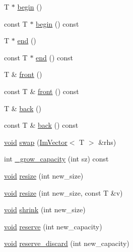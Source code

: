 \begin{DoxyCompactItemize}
\item 
T $\ast$ \hyperlink{structImVector_a470909b2720bc5cb71ec023439e9c814}{begin} ()
\item 
const T $\ast$ \hyperlink{structImVector_a05442a30c96197c24d17e736cd2a68b2}{begin} () const
\item 
T $\ast$ \hyperlink{structImVector_aeb429e7d05b6651dfc716ecdb198dde4}{end} ()
\item 
const T $\ast$ \hyperlink{structImVector_a541696299caf4b0477e57b27db70d32c}{end} () const
\item 
T \& \hyperlink{structImVector_a34ba855bd3a1ee3e2af215c5ce7d6ddc}{front} ()
\item 
const T \& \hyperlink{structImVector_a67e0e856307bbd927e4253461d3772c7}{front} () const
\item 
T \& \hyperlink{structImVector_a6da15f3c402099ed57078835ab942f8e}{back} ()
\item 
const T \& \hyperlink{structImVector_a480aba1c78064ca5370249b38a5ae207}{back} () const
\item 
\hyperlink{imgui__impl__opengl3__loader_8h_ac668e7cffd9e2e9cfee428b9b2f34fa7}{void} \hyperlink{structImVector_afcec0d2a1e28aebe412b6efd06f0a77a}{swap} (\hyperlink{structImVector}{Im\+Vector}$<$ T $>$ \&rhs)
\item 
int \hyperlink{structImVector_a3a097635d464b1b70dc7d59996a88b28}{\+\_\+grow\+\_\+capacity} (int sz) const
\item 
\hyperlink{imgui__impl__opengl3__loader_8h_ac668e7cffd9e2e9cfee428b9b2f34fa7}{void} \hyperlink{structImVector_ac371dd62e56ae486b1a5038cf07eee56}{resize} (int new\+\_\+size)
\item 
\hyperlink{imgui__impl__opengl3__loader_8h_ac668e7cffd9e2e9cfee428b9b2f34fa7}{void} \hyperlink{structImVector_abe7f21776ecfb7d0214963fd8c0689f0}{resize} (int new\+\_\+size, const T \&v)
\item 
\hyperlink{imgui__impl__opengl3__loader_8h_ac668e7cffd9e2e9cfee428b9b2f34fa7}{void} \hyperlink{structImVector_a8dafcce1e393244890f52ef1aa490876}{shrink} (int new\+\_\+size)
\item 
\hyperlink{imgui__impl__opengl3__loader_8h_ac668e7cffd9e2e9cfee428b9b2f34fa7}{void} \hyperlink{structImVector_a0f14f5736c3372157856eebb67123b75}{reserve} (int new\+\_\+capacity)
\item 
\hyperlink{imgui__impl__opengl3__loader_8h_ac668e7cffd9e2e9cfee428b9b2f34fa7}{void} \hyperlink{structImVector_a4120d4da7804ae0a34aa521dbb8e1994}{reserve\+\_\+discard} (int new\+\_\+capacity)
\item 

\end{DoxyCompactItemize}
